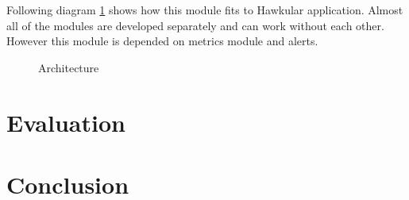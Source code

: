 Following diagram \ref{img_arch} shows how this module fits to Hawkular application.
Almost all of the modules are developed separately and can work without each
other. However this module is depended on metrics module and alerts. 
\begin{figure}[H]
    \begin{center}
        \caption{Architecture}
        \label{img_arch}
    \end{center}
\end{figure}


\chapter{Evaluation}
\chapter{Conclusion}
\cite{rfc_owamp} %

